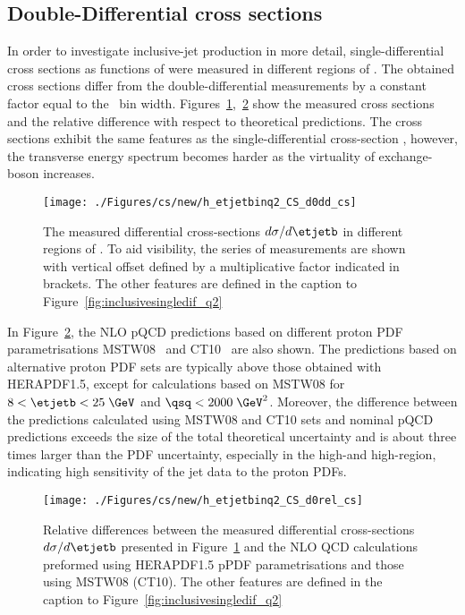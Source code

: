 \subsection{Double-Differential cross sections}
In order to investigate inclusive-jet production in more detail, single-differential cross sections as functions of \etjetb were measured in different regions of \qsq. The obtained cross sections differ from the double-differential measurements by a constant factor equal to the \qsq~bin width. Figures~\ref{fig:inclusive_doubledif},~\ref{fig:inclusive_doubledif_rel} show the measured cross sections and the relative difference with respect to theoretical predictions. The cross sections exhibit the same features as the single-differential cross-section \dsdetjetb, however, the transverse energy spectrum becomes harder as the virtuality of exchange-boson increases.
%
\begin{figure}[p]
	\centering
		\texttt{[image: ./Figures/cs/new/h\_etjetbinq2\_CS\_d0dd\_cs]}
	\caption{The measured differential cross-sections $d\sigma/d\etjetb$ in different regions of \qsq. To aid visibility, the series of measurements are shown with vertical offset defined by a multiplicative factor indicated in brackets. The other features are defined in the caption to Figure~\ref{fig:inclusivesingledif_q2}}
	\label{fig:inclusive_doubledif}
\end{figure}

In Figure~\ref{fig:inclusive_doubledif_rel}, the NLO pQCD predictions based on different proton PDF parametrisations MSTW08~\cite{Martin:2009iq} and CT10~\cite{Gao:2013xoa} are also shown. The predictions based on alternative proton PDF sets are typically above those obtained with HERAPDF1.5, except for calculations based on MSTW08 for $8 < \etjetb <25\;\GeV$ and $\qsq<2000\;\GeV^2$. Moreover, the difference between the predictions calculated using MSTW08 and CT10 sets and nominal pQCD predictions exceeds the size of the total theoretical uncertainty and is about three times larger than the PDF uncertainty, especially in the high-\etjetb and high-\qsq region, indicating high sensitivity of the jet data to the proton PDFs.
\begin{figure}[p]
	\centering
		\texttt{[image: ./Figures/cs/new/h\_etjetbinq2\_CS\_d0rel\_cs]}
  \caption{Relative differences between the measured differential cross-sections $d\sigma/d\etjetb$ presented in Figure~\ref{fig:inclusive_doubledif} and the NLO QCD calculations preformed using HERAPDF1.5 pPDF parametrisations and those using MSTW08 (CT10). The other features are defined in the caption to Figure~\ref{fig:inclusivesingledif_q2}}
	\label{fig:inclusive_doubledif_rel}
\end{figure}

